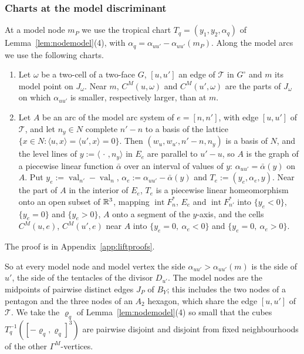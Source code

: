 \subsubsection*{Charts at the model discriminant}
At a model node $m_P$ we use the tropical chart $T_q=(y_1,y_2,\alpha_q)$ of Lemma~\ref{lem:nodemodel}(4), with
$\alpha_q=\alpha_{uu'}-\alpha_{uu'}(m_P)$. Along the model arcs we use the following charts.

\begin{lemma}\label{lem:tropcharts}
\begin{enumerate}
\item Let $\omega$ be a two-cell of a two-face $G$, $[u,u']$ an edge of $\mathcal T$ in $G^\circ$ and $m$ its model point on
$J_\omega$. Near $m$, $C^M(u,\omega)$ and $C^M(u',\omega)$ are the parts of $J_\omega$ on which $\alpha_{uu'}$ is smaller,
respectively larger, than at $m$.
\item Let $A$ be an arc of the model arc system of $e=[n,n']$, with edge $[u,u']$ of $\mathcal T$, and let $n_y\in N$
complete $n'-n$ to a basis of the lattice $\{x\in N:\langle u,x\rangle=\langle u',x\rangle=0\}$. Then
$(w_u,w_{u'},n'-n,n_y)$ is a basis of $N$, and the level lines of $y:=\langle\,\cdot\,,n_y\rangle$ in $E_e$ are parallel to
$u'-u$, so $A$ is the graph of a piecewise linear function $\bar\alpha$ over an interval of values of $y$:
$\alpha_{uu'}=\bar\alpha(y)$ on $A$. Put $y_e:=\operatorname{val}_{n'}-\operatorname{val}_n$,
$\alpha_e:=\alpha_{uu'}-\bar\alpha(y)$ and $T_e:=(y_e,\alpha_e,y)$. Near the part of $A$ in the interior of $E_e$, $T_e$
is a piecewise linear homeomorphism onto an open subset of $\mathbb R^3$, mapping $\operatorname{int}F^*_n$, $E_e$ and
$\operatorname{int}F^*_{n'}$ into $\{y_e<0\}$, $\{y_e=0\}$ and $\{y_e>0\}$, $A$ onto a segment of the $y$-axis, and the
cells $C^M(u,e)$, $C^M(u',e)$ near $A$ into $\{y_e=0,\ \alpha_e<0\}$ and $\{y_e=0,\ \alpha_e>0\}$.
\end{enumerate}
\end{lemma}

The proof is in Appendix~\ref{app:liftproofs}.

So at every model node and model vertex the side $\alpha_{uu'}>\alpha_{uu'}(m)$ is the side of $u'$, the side of the
tentacles of the divisor $D_{u'}$. The model nodes are the midpoints of pairwise distinct edges $J_P$ of $B_Y$; this
includes the two nodes of a pentagon and the three nodes of an $A_2$ hexagon, which share the edge $[u,u']$ of
$\mathcal T$. We take the $\varrho_q$ of Lemma~\ref{lem:nodemodel}(4) so small that the cubes
$T_q^{-1}([-\varrho_q,\varrho_q]^3)$ are pairwise disjoint and disjoint from fixed neighbourhoods of the other
$\Gamma^M$-vertices.

